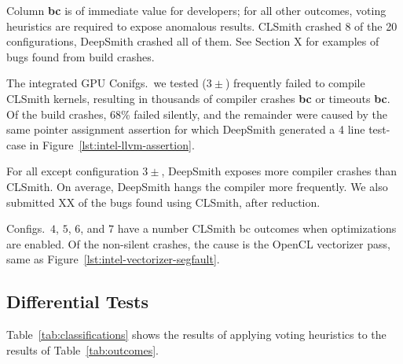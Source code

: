 Column \textbf{bc} is of immediate value for developers; for all other outcomes, voting heuristics are required to expose anomalous results. CLSmith crashed 8 of the 20 configurations, DeepSmith crashed all of them. See Section X for examples of bugs found from build crashes.

The integrated GPU Conifgs.\ we tested ($3\pm$) frequently failed to compile CLSmith kernels, resulting in thousands of compiler crashes \textbf{bc} or timeouts \textbf{bc}.
Of the build crashes, 68\% failed silently, and the remainder were caused by the same pointer assignment assertion for which DeepSmith generated a 4 line test-case in Figure~\ref{lst:intel-llvm-assertion}. 

For all except configuration $3\pm$, DeepSmith exposes more compiler crashes than CLSmith. On average, DeepSmith hangs the compiler more frequently. We also submitted XX of the bugs found using CLSmith, after reduction.

Configs.\ $4$, $5$, $6$, and $7$ have a number CLSmith bc outcomes when optimizations are enabled. Of the non-silent crashes, the cause is the OpenCL vectorizer pass, same as Figure~\ref{lst:intel-vectorizer-segfault}.




\subsection{Differential Tests}

Table~\ref{tab:classifications} shows the results of applying voting heuristics to the results of Table~\ref{tab:outcomes}.


